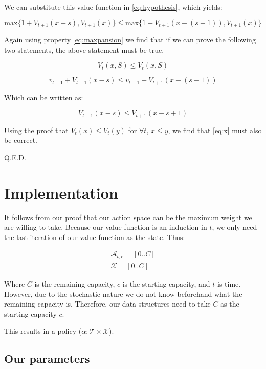 \documentclass[nonacm,sigconf]{acmart}
\begin{document}
We can substitute this value function in \cref{eq:hypothesis}, which yields:

\begin{equation}
    \text{max}\{1+V_{t+1}(x-s), V_{t+1}(x)\} \le
    \text{max}\{1+V_{t+1}(x-(s-1)), V_{t+1}(x)\}
\end{equation}

Again using property \cref{eq:maxpansion} we find that if we can prove the
following two statements, the above statement must be true.

\begin{equation}
    V_t(x, S) \leq V_t(x, S)
\end{equation}

\begin{equation}
    v_{t+1} + V_{t+1}(x-s) \leq v_{t+1} + V_{t+1}(x-(s-1))
\end{equation}

Which can be written as:

\begin{equation}\label{eq:x}
    V_{t+1}(x-s) \leq V_{t+1}(x-s+1)
\end{equation}

Using the proof that $ V_{t}(x) \leq V_{t}(y) $ for $\forall t$, $ x \leq y $,
we find that \cref{eq:x} must also be correct.

Q.E.D.

\section{Implementation}

It follows from our proof that our action space can be the maximum weight we are
willing to take. Because our value function is an induction in $t$, we only need
the last iteration of our value function as the state. Thus:

\begin{gather}
    \mathcal{A}_{t,c} = [0..C] \nonumber \\
    \mathcal{X} = [0..C] \nonumber
\end{gather}

Where $C$ is the remaining capacity, $c$ is the starting capacity, and $t$ is
time. However, due to the stochastic nature we do
not know beforehand what the remaining capacity is. Therefore, our
data structures
need to take $C$ as the starting capacity $c$.

This results in a policy ($\alpha: \mathcal{T} \times \mathcal{X}$).

\subsection{Our parameters}
\end{document}
